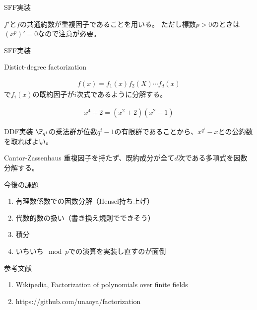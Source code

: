 \documentclass[uplatex]{beamer}
\begin{document}
\begin{frame}{SFF実装}

$f'$と$f$の共通約数が重複因子であることを用いる。
ただし標数$p>0$のときは$(x^p)'=0$なので注意が必要。


\end{frame}

\begin{frame}{SFF実装}
\end{frame}


\begin{frame}{Distict-degree factorization}

\begin{align*}
f(x)=f_1(x)f_2(X)\cdots f_d(x)
\end{align*}
で$f_i(x)$の既約因子が$i$次式であるように分解する。

\begin{align*}
x^4+2=(x^2+2)(x^2+1)
\end{align*}
\end{frame}

\begin{frame}{DDF実装}
$\F_{q^i}$の乗法群が位数$q^i-1$の有限群であることから、$x^{q^i}-x$との公約数を取ればよい。

\end{frame}

\begin{frame}{Cantor-Zassenhaus}
重複因子を持たず、既約成分が全て$d$次である多項式を因数分解する。

\end{frame}

\begin{frame}{今後の課題}
\begin{enumerate}
\item 有理数係数での因数分解（Hensel持ち上げ）
\item 代数的数の扱い（書き換え規則でできそう）
\item 積分
\item いちいち$\mod p$での演算を実装し直すのが面倒
\end{enumerate}
\end{frame}

\begin{frame}{参考文献}
\begin{enumerate}
\item Wikipedia, Factorization of polynomials over finite fields
\item https://github.com/unaoya/factorization
\end{enumerate}
\end{frame}
\end{document}
